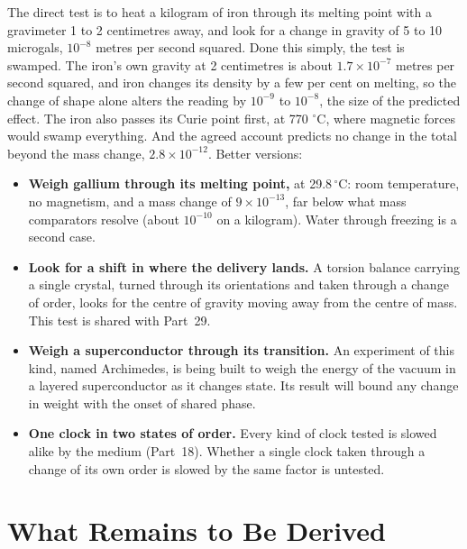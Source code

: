 \documentclass[11pt,a4paper]{article}
\begin{document}
The direct test is to heat a kilogram of iron through its melting point with a gravimeter 1 to 2 centimetres away, and look for a change in gravity of 5 to 10 microgals, $10^{-8}$ metres per second squared. Done this simply, the test is swamped. The iron's own gravity at 2 centimetres is about $1.7\times10^{-7}$ metres per second squared, and iron changes its density by a few per cent on melting, so the change of shape alone alters the reading by $10^{-9}$ to $10^{-8}$, the size of the predicted effect. The iron also passes its Curie point first, at 770 $^\circ$C, where magnetic forces would swamp everything. And the agreed account predicts no change in the total beyond the mass change, $2.8\times10^{-12}$. Better versions:
\begin{itemize}
\item \textbf{Weigh gallium through its melting point,} at 29.8\,$^\circ$C: room temperature, no magnetism, and a mass change of $9\times10^{-13}$, far below what mass comparators resolve (about $10^{-10}$ on a kilogram).  Water through freezing is a second case.
\item \textbf{Look for a shift in where the delivery lands.} A torsion balance carrying a single crystal, turned through its orientations and taken through a change of order, looks for the centre of gravity moving away from the centre of mass. This test is shared with Part~29.
\item \textbf{Weigh a superconductor through its transition.} An experiment of this kind, named Archimedes, is being built to weigh the energy of the vacuum in a layered superconductor as it changes state. Its result will bound any change in weight with the onset of shared phase.
\item \textbf{One clock in two states of order.} Every kind of clock tested is slowed alike by the medium (Part~18). Whether a single clock taken through a change of its own order is slowed by the same factor is untested.
\end{itemize}

\section{What Remains to Be Derived}
\label{sec:owed}
\end{document}
